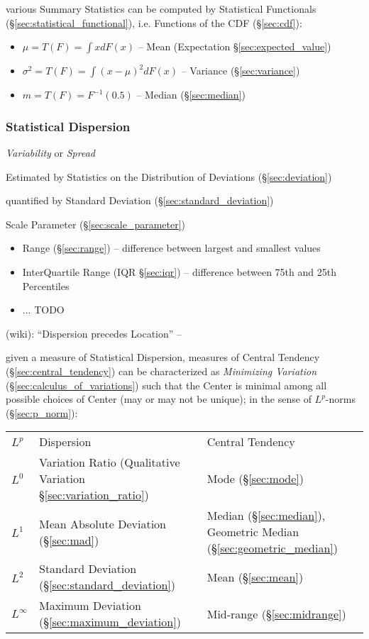 various Summary Statistics can be computed by Statistical Functionals
(\S\ref{sec:statistical_functional}), i.e. Functions of the CDF
(\S\ref{sec:cdf}):
\begin{itemize}
  \item $\mu = T(F) = \int x dF(x)$
    -- Mean (Expectation \S\ref{sec:expected_value})
  \item $\sigma^2 = T(F) = \int (x - \mu)^2 dF(x)$
    -- Variance (\S\ref{sec:variance})
  \item $m = T(F) = F^{-1}(0.5)$
    -- Median (\S\ref{sec:median})
\end{itemize}



\subsubsection{Statistical Dispersion}\label{sec:dispersion}

\emph{Variability} or \emph{Spread}

Estimated by Statistics on the Distribution of Deviations
(\S\ref{sec:deviation})

quantified by Standard Deviation (\S\ref{sec:standard_deviation})

\fist Scale Parameter (\S\ref{sec:scale_parameter})

\begin{itemize}
  \item Range (\S\ref{sec:range}) -- difference between largest and smallest
    values
  \item InterQuartile Range (IQR \S\ref{sec:iqr}) -- difference between 75th and
    25th Percentiles
  \item ... TODO
\end{itemize}

(wiki): ``Dispersion precedes Location'' --

given a measure of Statistical Dispersion, measures of Central Tendency
(\S\ref{sec:central_tendency}) can be characterized as \emph{Minimizing
  Variation} (\S\ref{sec:calculus_of_variations}) such that the Center is
minimal among all possible choices of Center (may or may not be unique); in the
sense of $L^p$-norms (\S\ref{sec:p_norm}):
\begin{tabular}{l l l}
  $L^p$ & Dispersion & Central Tendency \\
  $L^0$ & Variation Ratio (Qualitative Variation \S\ref{sec:variation_ratio})
    & Mode (\S\ref{sec:mode}) \\
  $L^1$ & Mean Absolute Deviation (\S\ref{sec:mad})
    & Median (\S\ref{sec:median}),
      Geometric Median (\S\ref{sec:geometric_median}) \\
  $L^2$ & Standard Deviation (\S\ref{sec:standard_deviation})
    & Mean (\S\ref{sec:mean}) \\
  $L^\infty$ & Maximum Deviation (\S\ref{sec:maximum_deviation})
    & Mid-range (\S\ref{sec:midrange})
\end{tabular}

